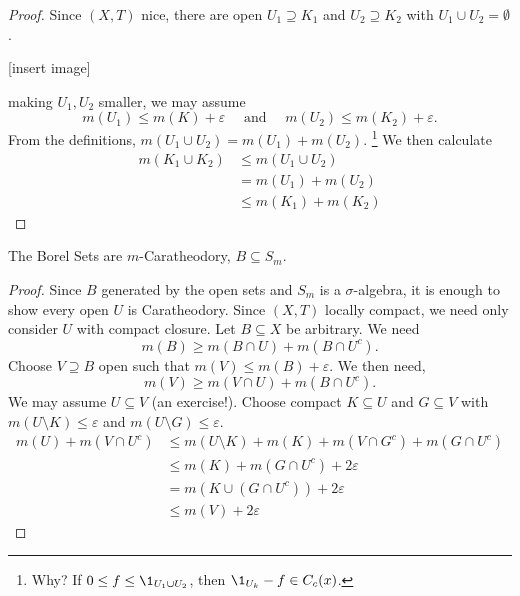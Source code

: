 \begin{proof}
	Since $(X,T)$ nice, there are open $U_1 \supseteq K_1$ and $U_2 \supseteq K_2$ with $U_1 \cup U_2 = \emptyset$.

	[insert image]

	making $U_1, U_2$ smaller, we may assume
	\[
		m(U_1) \leq m(K) + \varepsilon \quad \textrm{ and } \quad m(U_2) \leq m(K_2) + \varepsilon.
	\]
	From the definitions, $m(U_1 \cup U_2) = m(U_1) + m(U_2)$.
	\footnote{Why? If $0 \leq f \leq \1_{U_1 \cup U_2}$, then $\1_{U_k} - f \in C_c(x)$.}
	We then calculate 
	\begin{align*}
		m(K_1 \cup K_2) & \leq m(U_1 \cup U_2) \\
										& = m(U_1) + m(U_2) \\
										& \leq m(K_1) + m(K_2)
	\end{align*}
\end{proof}

\begin{lemma}
  The Borel Sets are $m$-Caratheodory, $B \subseteq S_m$.
\end{lemma}

\begin{proof}
	Since $B$ generated by the open sets and $S_m$ is a $\sigma$-algebra,
	it is enough to show every open $U$ is Caratheodory. 
	Since $(X,T)$ locally compact, we need only consider $U$ with compact closure.
	Let $B \subseteq X$ be arbitrary. We need 
	\[
		m(B) \geq m(B \cap U) + m(B \cap U^{c}).
	\]
	Choose $V \supseteq B$ open such that $m(V) \leq m(B) + \varepsilon$. We then need, 
	\[
		m(V) \geq m(V \cap U) + m(B \cap U^{c}).
	\]
	We may assume $U \subseteq V$ (an exercise!).
	Choose compact $K \subseteq U$ and $G \subseteq V$ with $m(U \setminus K) \leq \varepsilon$ 
	and $m(U \setminus G) \leq \varepsilon$.
	\begin{align*}
		m(U) + m(V \cap U^{c}) & \leq m(U \setminus K) + m(K) + m(V \cap G^{c}) + m(G \cap U^{c}) \\
													 & \leq m(K) + m(G \cap U^{c}) + 2\varepsilon \\
													 & = m(K \cup (G \cap U^{c})) + 2\varepsilon \\
													 & \leq m(V) + 2 \varepsilon
	\end{align*}
\end{proof}

